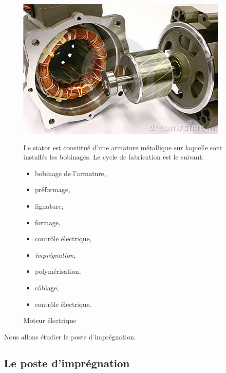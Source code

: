 \begin{figure}[htbp]
\begin{minipage}[c]{.30\linewidth}
\begin{center}
\includegraphics[width=\linewidth]{img/moteur.jpg}
\caption{Moteur électrique}
\label{fig:impre}
\end{center}
\end{minipage}
\hfill
\begin{minipage}[c]{.65\linewidth}
Le stator est constitué d'une armature métallique sur laquelle sont installés les bobinages. Le cycle de fabrication est le suivant:
\begin{itemize}
 \item bobinage de l'armature,
 \item préformage,
 \item lignature,
 \item formage,
 \item contrôle électrique,
 \item \textit{imprégnation},
 \item polymérisation,
 \item câblage,
 \item contrôle électrique.
\end{itemize}
\end{minipage}
\end{figure}


Nous allons étudier le poste d'imprégnation.

\subsection{Le poste d'imprégnation}

